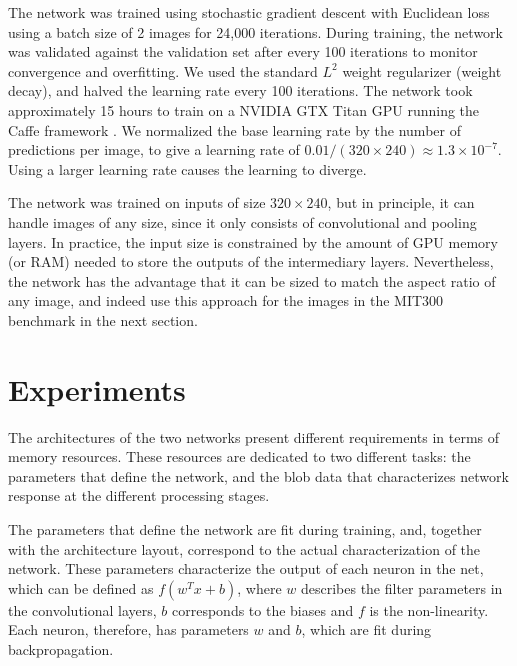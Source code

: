 \documentclass[10pt,twocolumn,letterpaper]{article}
\begin{document}
The network was trained using stochastic gradient descent with Euclidean loss using a batch size of 2 images for 24,000 iterations. During training, the network was validated against the validation set after every 100 iterations to monitor convergence and overfitting. We used the standard $L^2$ weight regularizer (weight decay), and halved the learning rate every 100 iterations. The network took approximately 15 hours to train on a NVIDIA GTX Titan GPU running the Caffe framework \cite{jia2014caffe}. We normalized the base learning rate by the number of predictions per image, to give a learning rate of $0.01 / (320 \times 240) \approx 1.3 \times 10^{-7}$. Using a larger learning rate causes the learning to diverge.

The network was trained on inputs of size $320 \times 240$, but in principle, it can handle images of any size, since it only consists of convolutional and pooling layers. In practice, the input size is constrained by the amount of GPU memory (or RAM) needed to store the outputs of the intermediary layers. Nevertheless, the network has the advantage that it can be sized to match the aspect ratio of any image, and indeed use this approach for the images in the MIT300 benchmark in the next section.


\section{Experiments}\label{sec:experiments}%

The architectures of the two networks present different requirements in terms of memory resources.
These resources are dedicated to two different tasks: the parameters that define the network, and the blob data that characterizes network response at the different processing stages.

The parameters that define the network are fit during training, and, together with the architecture layout, correspond to the actual characterization of the network.
These parameters characterize the output of each neuron in the net, which can be defined as $f(w^T x+b)$, where $w$ describes the filter parameters in the convolutional layers, $b$ corresponds to the biases and $f$ is the non-linearity.
Each neuron, therefore, has parameters $w$ and $b$, which are fit during backpropagation.
\end{document}
